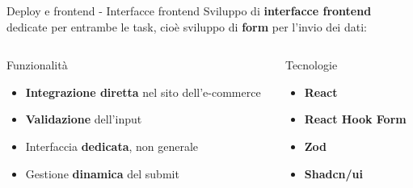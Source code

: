\documentclass{beamer}
\begin{document}
	\begin{frame}{Deploy e frontend - Interfacce frontend}
		Sviluppo di \textbf{interfacce frontend} dedicate per entrambe le task, cioè sviluppo di \textbf{form} per l'invio dei dati:

		\begin{columns}
			\begin{column}{0.64\textwidth}
				\begin{exampleblock}{Funzionalità}
					\begin{itemize}
						\item \textbf{Integrazione diretta} nel sito dell'e-commerce
						\item \textbf{Validazione} dell'input
						\item Interfaccia \textbf{dedicata}, non generale
						\item Gestione \textbf{dinamica} del submit
					\end{itemize}
				\end{exampleblock}
			\end{column}
			\begin{column}{0.36\textwidth}
				\begin{alertblock}{Tecnologie}
					\begin{itemize}
						\item \textbf{React}
						\item \textbf{React Hook Form}
						\item \textbf{Zod}
						\item \textbf{Shadcn/ui}
					\end{itemize}
				\end{alertblock}
			\end{column}
		\end{columns}


\end{frame}
\end{document}
